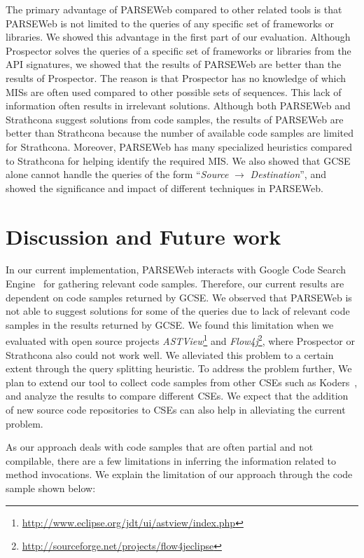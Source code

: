 \documentclass{fp035-thummalapenta}
\begin{document}
The primary advantage of PARSEWeb compared to other related tools is
that PARSEWeb is not limited to the queries of any specific set of
frameworks or libraries. We showed this advantage in the first part
of our evaluation. Although Prospector solves the queries of a
specific set of frameworks or libraries from the API signatures, we
showed that the results of PARSEWeb are better than the results of
Prospector. The reason is that Prospector has no knowledge of which
MISs are often used compared to other
possible sets of sequences. This lack of information often results in
irrelevant solutions. Although both PARSEWeb and Strathcona suggest
solutions from code samples, the results of PARSEWeb are better than
Strathcona because the number of available code samples are limited
for Strathcona. Moreover, PARSEWeb has many specialized heuristics
compared to Strathcona for helping identify the required MIS. We
also showed that GCSE alone cannot handle the queries of the form
``\emph{Source} $\rightarrow$ \emph{Destination}'', and showed the
significance and impact of different techniques in PARSEWeb.


\section{Discussion and Future work}
\label{sec:discussion} In our current implementation, PARSEWeb
interacts with Google Code Search Engine~\cite{GCSE} for gathering
relevant code samples. Therefore, our current results are dependent
on code samples returned by GCSE. We observed that PARSEWeb is not
able to suggest solutions for some of the queries due to lack of
relevant code samples in the results returned by GCSE. We found this
limitation when we evaluated with open source projects
\emph{ASTView}\footnote{\url{http://www.eclipse.org/jdt/ui/astview/index.php}}
and
\emph{Flow4j}\footnote{\url{http://sourceforge.net/projects/flow4jeclipse}},
where Prospector or Strathcona also could not work well. We
alleviated this problem to a certain extent through the query
splitting heuristic. To address the problem further, We plan to
extend our tool to collect code samples from other CSEs such as
Koders~\cite{KODERS}, and analyze
the results to compare different CSEs. We expect that the addition
of new source code repositories to CSEs can also help in alleviating
the current problem.

As our approach deals with code samples that are often partial and not
compilable, there are a few limitations in inferring the information
related to method invocations. We explain the limitation of our
approach through the code sample shown below:
\end{document}
